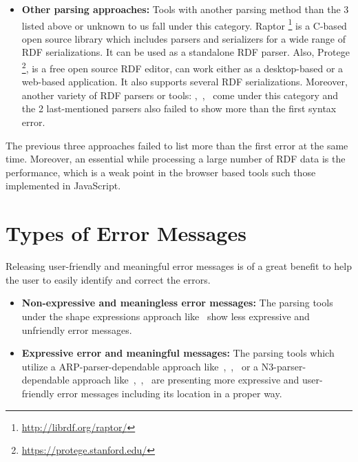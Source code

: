 \begin{itemize}[noitemsep]
\item \textbf{Other parsing approaches:} Tools with another parsing method than the 3 listed above or unknown to us fall under this category. Raptor \footnote{\url{http://librdf.org/raptor/}} is a C-based open source library which includes parsers and serializers for a wide range of RDF serializations. 
It can be used as a standalone RDF parser. 
Also, Protege \footnote{\url{https://protege.stanford.edu/}}, is a free open source RDF editor, can work either as a desktop-based or a web-based application. 
It also supports several RDF serializations. Moreover, another variety of RDF parsers or tools: \cite{humfrey2010easyrdf},~\cite{RDF4J:Online},~\cite{krech2002rdflib} come
under  this category and the 2 last-mentioned parsers also failed to show more than the first syntax error.            
\end{itemize} 
\vspace*{-5mm}

The previous three approaches failed to list more than the first error at the same time. 
Moreover, an essential while processing a large number of RDF data is the performance, which is a weak point in the browser based tools such those implemented in JavaScript.

\section{Types of Error Messages}

Releasing user-friendly and meaningful error messages is of a great benefit to help the user to easily identify and correct the errors. 
\begin{itemize}
    \item \textbf{Non-expressive and meaningless error messages:} The parsing tools under the shape expressions approach like~\cite{prud2014shape} show less expressive and unfriendly error messages.
    \item \textbf{Expressive error and meaningful messages:} The parsing tools which utilize a ARP-parser-dependable approach like~\cite{N3Parser:Online},~\cite{Mybluemix:Validation:Online},~\cite{McBride:2002:JSW:613357.613755} or a N3-parser-dependable approach like~\cite{N3Parser:Online},~\cite{IDLab:Validation:Online},~\cite{petersenturtleeditor} are presenting more expressive and user-friendly error messages including its location in a proper way. 
    
\end{itemize}


